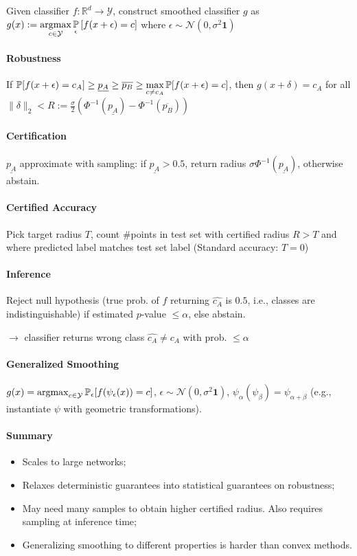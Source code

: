 Given classifier $f : \mathbb{R}^d \to \mathcal{Y}$, construct smoothed classifier $g$ as $\displaystyle g(x) := \argmax_{c \in \mathcal{Y}} \P_\epsilon \left[f(x+\epsilon) = c\right]$ where $\epsilon \sim \mathcal{N}(0, \sigma^2 \mathbf{1})$

\paragraph{Robustness}
If $\displaystyle \P[f(x+\epsilon) = c_A] \ge \underline{p_A} \ge \overline{p_B} \ge \max_{c \neq c_A} \P[f(x+\epsilon) = c]$, then $g(x+\delta) = c_A$ for all $\| \delta \|_2 < R := \frac{\sigma}{2} \left( \Phi^{-1}(\underline{p_A}) - \Phi^{-1}(\overline{p_B}) \right)$

\paragraph{Certification} $\underline{p_A}$ approximate with sampling: if $\underline{p_A} > 0.5$, return radius $\sigma \Phi^{-1}(\underline{p_A})$, otherwise abstain. 

\paragraph{Certified Accuracy}
Pick target radius $T$, count \#points in test set with certified radius $R > T$ and where predicted label matches test set label (Standard accuracy: $T=0$)

 \paragraph{Inference}
 Reject null hypothesis (true prob. of $f$ returning $\hat{c_A}$ is $0.5$, i.e., classes are indistinguishable) if estimated $p$-value $\le \alpha$, else abstain. 
 
 $\rightarrow$ classifier returns wrong class $\hat{c_A} \neq c_A$ with prob. $\le \alpha$
 
 \paragraph{Generalized Smoothing} 
 $g(x) = \argmax_{c \in \mathcal{Y}} \P_\epsilon[f(\psi_\epsilon(x)) = c]$, $\epsilon \sim \mathcal{N}(0, \sigma^2\mathbf{1})$, $\psi_\alpha(\psi_\beta) = \psi_{\alpha+\beta}$ (e.g., instantiate $\psi$ with geometric transformations). 
 
\paragraph{Summary}
\begin{itemize}
\item Scales to large networks;
\item Relaxes deterministic guarantees into statistical guarantees on robustness;
\item May need many samples to obtain higher certified radius. Also requires sampling at inference time;
\item Generalizing smoothing to different properties is harder than convex methods.
\end{itemize}

